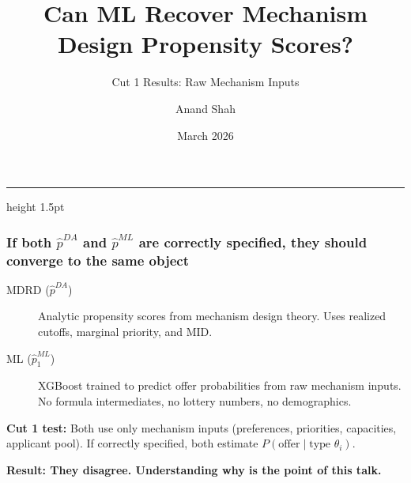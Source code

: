 \documentclass[aspectratio=169,11pt]{beamer}
\title{Can ML Recover Mechanism Design Propensity Scores?}
\subtitle{Cut 1 Results: Raw Mechanism Inputs}
\author{Anand Shah}
\date{March 2026}
\begin{document}
{
\begin{frame}[plain]
\vspace{2cm}
{\inserttitle}

\vspace{0.3cm}
{\color{clay}\hrule height 1.5pt}
\vspace{0.3cm}

{\color{white!80}\insertsubtitle}

\vspace{1.5cm}
{\color{white!60}\small\insertauthor\hspace{2cm}\insertdate}
\end{frame}
}

\begin{frame}
\frametitle{If both $\hat{p}^{DA}$ and $\hat{p}^{ML}$ are correctly specified,
they should converge to the same object}

\begin{description}
\item[MDRD ($\hat{p}^{DA}$)] Analytic propensity scores from mechanism design theory.
Uses realized cutoffs, marginal priority, and MID.

\item[ML ($\hat{p}^{ML}_1$)] XGBoost trained to predict offer probabilities from raw
mechanism inputs.
No formula intermediates, no lottery numbers, no demographics.
\end{description}

\vspace{0.5cm}
\textbf{Cut 1 test:}
Both use only mechanism inputs (preferences, priorities, capacities, applicant pool).
If correctly specified, both estimate $P(\text{offer} \mid \text{type } \theta_i)$.

\vspace{0.5cm}
\begin{center}
\colorbox{sand}{%
\parbox{0.8\textwidth}{\centering\color{charcoal}\textbf{Result: They disagree.
Understanding why is the point of this talk.}}}
\end{center}
\end{frame}
\end{document}
